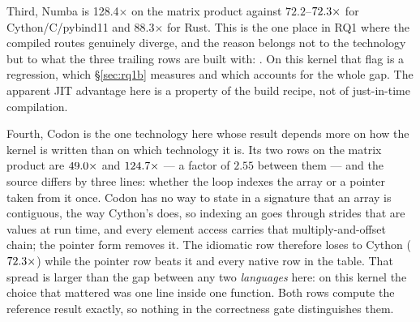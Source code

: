 Third, Numba is 128.4$\times$ on the matrix product against $72.2$--$\meas{ratio:b1_compute-314:matmul/cpython_loop|b1_compute-314:matmul/cython}{72.3}\times$ for
Cython/C/pybind11 and 88.3$\times$ for Rust. This is the one place in RQ1 where the compiled
routes genuinely diverge, and the reason belongs not to the technology but to what the three
trailing rows are built with: . On this kernel that flag is a
regression, which \S\ref{sec:rq1b} measures and which accounts for the whole gap. The apparent
JIT advantage here is a property of the build recipe, not of just-in-time compilation.

Fourth, Codon is the one technology here whose result depends more on how the kernel is
written than on which technology it is. Its two rows on the matrix product are $\meas{ratio:b1_compute-314:matmul/cpython_loop|b1_compute-314:matmul/codon_pyext}{49.0}\times$ and
$\meas{ratio:b1_compute-314:matmul/cpython_loop|b1_compute-314:matmul/codon_pyext_ptr}{124.7}\times$ --- a factor of $2.55$ between them --- and the source differs by three lines:
whether the loop indexes the array or a pointer taken from it once. Codon has no way to state
in a signature that an array is contiguous, the way Cython's  does, so
indexing an  goes through strides that are values at run time, and every element
access carries that multiply-and-offset chain; the pointer form removes it. The idiomatic row therefore loses to Cython ($\meas{ratio:b1_compute-314:matmul/cpython_loop|b1_compute-314:matmul/cython}{72.3}\times$) while the
pointer row beats it and every native row in the table. That spread is larger than the gap
between any two \emph{languages} here: on this kernel the choice that mattered was one line
inside one function. Both rows compute the
reference result exactly, so nothing in the correctness gate distinguishes them.

